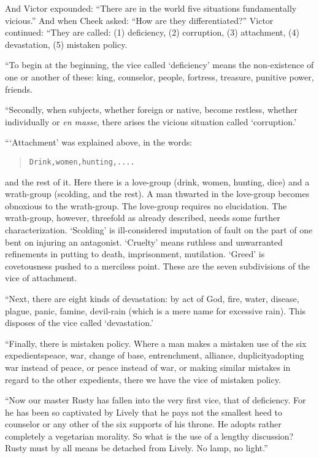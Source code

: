 \documentclass[article, twoside, 14pt]{memoir}
\renewenvironment{verbatim}{%
\begin{quote}%
\vskip -10pt%
\begin{alltt}\normalfont\large}{\end{alltt}%
\end{quote}%
\vskip -10pt
} %
\begin{document}
And Victor expounded:
``There are in the world five situations fundamentally vicious.''
And when Cheek asked: ``How are they differentiated?'' Victor
continued: “They are called: (1) deficiency, (2) corruption, (3)
attachment, (4) devastation, (5) mistaken policy.

“To begin at the beginning, the vice called `deficiency' means the
non-existence of one or another of these: king, counselor, people,
fortress, treasure, punitive power, friends.

“Secondly, when subjects, whether foreign or native, become
restless, whether individually or \emph{en masse}, there arises the
vicious situation called `corruption.'

“`Attachment' was explained above, in the words:

\begin{verbatim}
Drink, women, hunting, ....
\end{verbatim}
and the rest of it. Here there is a love-group (drink, women,
hunting, dice) and a wrath-group (scolding, and the rest). A man
thwarted in the love-group becomes obnoxious to the wrath-group.
The love-group requires no elucidation. The wrath-group, however,
threefold as already described, needs some further
characterization. `Scolding' is ill-considered imputation of fault
on the part of one bent on injuring an antagonist. `Cruelty' means
ruthless and unwarranted refinements in putting to death,
imprisonment, mutilation. `Greed' is covetousness pushed to a
merciless point. These are the seven subdivisions of the vice of
attachment.

“Next, there are eight kinds of devastation: by act of God, fire,
water, disease, plague, panic, famine, devil-rain (which is a mere
name for excessive rain). This disposes of the vice called
`devastation.'

“Finally, there is mistaken policy. Where a man makes a mistaken
use of the six expedients{\textemdash}peace, war, change of base,
entrenchment, alliance, duplicity{\textemdash}adopting war instead of peace,
or peace instead of war, or making similar mistakes in regard to
the other expedients, there we have the vice of mistaken policy.

``Now our master Rusty has fallen into the very first vice, that of deficiency. For he has been so captivated by Lively that he pays not the smallest heed to counselor or any other of the six supports of his throne. He adopts rather completely a vegetarian morality. So what is the use of a lengthy discussion? Rusty must by all means be detached from Lively. No lamp, no light.''
\end{document}
